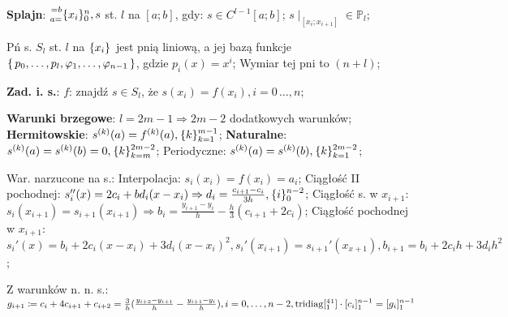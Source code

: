 
\entry
\textbf{Splajn}:
$\ipoints[0][n][a=][=b]{x_i}, s$
st. $l$ na $[a;b]$, gdy:
$s\in C^{l-1}[a;b]$;
$s\mid_{[x_i;x_{i+1}]} \in \mathbb{P}_l$;

\entry
Pń s. $S_l$ st. $l$ na $\ipoints{x_i}$ jest pnią liniową,
a jej bazą funkcje
$\set{p_0, \ldots, p_l, \varphi_1, \ldots, \varphi_{n-1}}$,
gdzie $p_i(x)=x^i$;
\entry
Wymiar tej pni to $(n+l)$;

\entry
\textbf{Zad. i. s.}:
$f$: znajdź $s\in S_l$, że
$s(x_i)=f(x_i), i=0\,\dots,n$;

\entry
\textbf{Warunki brzegowe}:
$l=2m-1 \Rightarrow 2m-2$ dodatkowych warunków;
\entry
\textbf{Hermitowskie}:
$\deriv{s}{k}(a) = \deriv{f}{k}(a), \ipoints[k=1][m-1]{k}$;
\entry
\textbf{Naturalne}:
$\deriv{s}{k}(a)=\deriv{s}{k}(b)=0, \ipoints[k=m][2m-2]{k}$;
\entry
Periodyczne:
$\deriv{s}{k}(a)=\deriv{s}{k}(b), \ipoints[k=1][2m-2]{k}$;

\entry
War. narzucone na s.:
Interpolacja:
$s_i(x_i)=f(x_i)=a_i$;
Ciągłość II pochodnej:
$s_i''(x) = 2c_i+bd_i(x-x_i) \Rightarrow d_i=\frac{c_{i+1} - c_i}{3h}, \ipoints[0][n-2]{i}$;
Ciągłość s. w $x_{i+1}$:
$s_i(x_{i+1}) = s_{i+1}(x_{i+1}) \Rightarrow b_i = \frac{y_{i+1} - y_i}{h} - \frac{h}{3}(c_{i+1} + 2c_i)$;
Ciągłość pochodnej w $x_{i+1}$:
$
s_i'(x) = b_i +2c_i(x - x_i) + 3 d_i (x - x_i)^2,
s_i'(x_{i+1}) = s_{i+1}'(x_{x+1}),
b_{i+1} = b_i + 2 c_i h + 3 d_i h^2
$;

\entry
Z warunków n. n. s.:
$
g_{i+1} \coloneqq
c_i + 4c_{i+1} + c_{i+2} =
\frac{3}{h}(\frac{y_{i+2} - y_{i+1}}{h} - \frac{y_{i+1} - y_{i}}{h}),
i=0,\ldots, n-2,
\mathrm{tridiag}[\prescript{4}{1}{}^{1}] \cdot [c_i]^{n-1}_{1} = [g_i]^{n-1}_{1}
$
